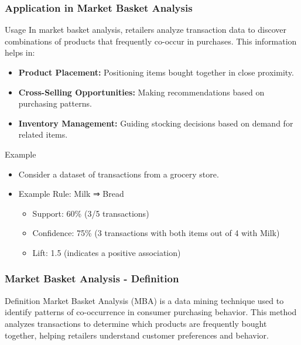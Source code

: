 \documentclass[aspectratio=169]{beamer}
\begin{document}
\begin{frame}[fragile]
    \frametitle{Application in Market Basket Analysis}
    \begin{block}{Usage}
        In market basket analysis, retailers analyze transaction data to discover combinations of products that frequently co-occur in purchases. This information helps in:
        \begin{itemize}
            \item \textbf{Product Placement:} Positioning items bought together in close proximity.
            \item \textbf{Cross-Selling Opportunities:} Making recommendations based on purchasing patterns.
            \item \textbf{Inventory Management:} Guiding stocking decisions based on demand for related items.
        \end{itemize}
    \end{block}

    \begin{block}{Example}
        \begin{itemize}
            \item Consider a dataset of transactions from a grocery store.
            \item Example Rule: Milk ⇒ Bread
            \begin{itemize}
                \item Support: 60\% (3/5 transactions)
                \item Confidence: 75\% (3 transactions with both items out of 4 with Milk)
                \item Lift: 1.5 (indicates a positive association)
            \end{itemize}
        \end{itemize}
    \end{block}
\end{frame}

\begin{frame}[fragile]
    \frametitle{Market Basket Analysis - Definition}
    \begin{block}{Definition}
        Market Basket Analysis (MBA) is a data mining technique used to identify patterns of co-occurrence in consumer purchasing behavior. 
        This method analyzes transactions to determine which products are frequently bought together, helping retailers understand customer preferences and behavior.
    \end{block}
\end{frame}
\end{document}
